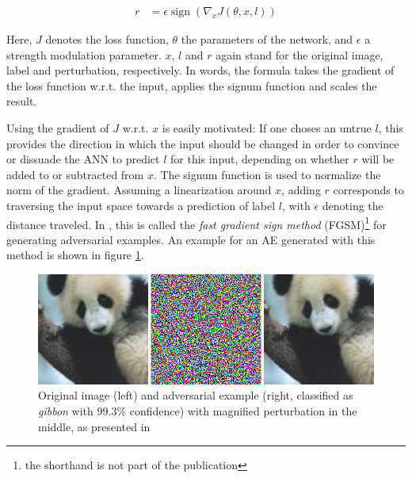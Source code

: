 \documentclass[11pt, a4paper]{article}
\newcommand\braces[1]{\left(#1\right)}
\DeclareMathOperator{\sign}{sign}
\begin{document}
\begin{align}
	r &= \epsilon \sign \braces{\nabla_x J\braces{\theta, x, l}} \label{eq:fast-gradient-sign-method}
\end{align}

Here, $J$ denotes the loss function, $\theta$ the parameters of the network, and $\epsilon$ a strength modulation parameter. $x$, $l$ and $r$ again stand for the original image, label and perturbation, respectively. In words, the formula takes the gradient of the loss function w.r.t. the input, applies the signum function and scales the result.

Using the gradient of $J$ w.r.t. $x$ is easily motivated: If one choses an untrue $l$, this provides the direction in which the input should be changed in order to convince or dissuade the ANN to predict $l$ for this input, depending on whether $r$ will be added to or subtracted from $x$. The signum function is used to normalize the norm of the gradient. Assuming a linearization around $x$, adding $r$ corresponds to traversing the input space towards a prediction of label $l$, with $\epsilon$ denoting the distance traveled. In \cite{explaining-and-harnessing-adversarial-examples}, this is called the \emph{fast gradient sign method} (FGSM)\footnote{the shorthand is not part of the publication} for generating adversarial examples. An example for an AE generated with this method is shown in figure \ref{fig:harnessing-ae}.

\begin{figure}[htp]
	\centering
	\includegraphics[width=\textwidth]{images/harnessing_ae.png}
	\caption{Original image (left) and adversarial example (right, classified as \emph{gibbon} with $99.3\%$ confidence) with magnified perturbation in the middle, as presented in \cite{explaining-and-harnessing-adversarial-examples}}
	\label{fig:harnessing-ae}
\end{figure}
\end{document}
